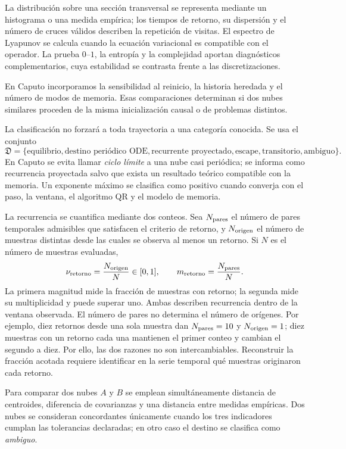 La distribución sobre una sección transversal se representa mediante un
histograma o una medida empírica; los tiempos de retorno, su dispersión y el
número de cruces válidos describen la repetición de visitas. El espectro de
Lyapunov se calcula cuando la ecuación variacional es compatible con el
operador. La prueba \(0\)--\(1\), la entropía y la complejidad aportan
diagnósticos complementarios, cuya estabilidad se contrasta frente a las
discretizaciones.

En Caputo incorporamos la sensibilidad al reinicio, la historia heredada y
el número de modos de memoria. Esas comparaciones determinan si dos nubes
similares proceden de la misma inicialización causal o de problemas distintos.

La clasificación no forzará a toda trayectoria a una categoría conocida. Se
usa el conjunto
\begin{equation}
 \mathfrak D=\{\text{equilibrio},\text{destino periódico ODE},
 \text{recurrente proyectado},\text{escape},\text{transitorio},
 \text{ambiguo}\}.
 \label{camp:eq-destination-set}
\end{equation}
En Caputo se evita llamar \emph{ciclo límite} a una nube casi periódica; se
informa como recurrencia proyectada salvo que exista un resultado teórico
compatible con la memoria. Un exponente máximo se clasifica como positivo
cuando converja con el paso, la ventana, el algoritmo QR y el modelo de memoria.

La recurrencia se cuantifica mediante dos conteos. Sea \(N_{\rm pares}\) el
número de pares temporales admisibles que satisfacen el criterio de retorno,
y \(N_{\rm origen}\) el número de muestras distintas desde las cuales se
observa al menos un retorno. Si \(N\) es el número de muestras evaluadas,
\[
 \nu_{\rm retorno}=\frac{N_{\rm origen}}{N}\in[0,1],
 \qquad
 m_{\rm retorno}=\frac{N_{\rm pares}}{N}.
\]
La primera magnitud mide la fracción de muestras con retorno; la segunda mide
su multiplicidad y puede superar uno. Ambas describen recurrencia dentro de
la ventana observada.
El número de pares no determina el número de orígenes. Por ejemplo, diez
retornos desde una sola muestra dan \(N_{\rm pares}=10\) y
\(N_{\rm origen}=1\); diez muestras con un retorno cada una mantienen el
primer conteo y cambian el segundo a diez. Por ello, las dos razones no son
intercambiables. Reconstruir la fracción acotada requiere identificar en la
serie temporal qué muestras originaron cada retorno.

Para comparar dos nubes \(A\) y \(B\) se emplean simultáneamente distancia
de centroides, diferencia de covarianzas y una distancia entre medidas
empíricas. Dos nubes se consideran concordantes únicamente cuando los tres
indicadores cumplan las tolerancias declaradas; en otro caso el destino se
clasifica como \emph{ambiguo}.

